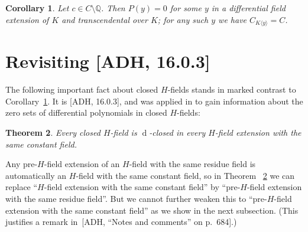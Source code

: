 \documentclass[]{amsart}
\numberwithin{equation}{section}
\newcommand{\bbold}{\mathbb}
\def\Q { {\bbold Q} }
\def \d{\operatorname{d}}
\def \<{\langle}
\def \>{\rangle}
\newtheorem{theorem}{Theorem}[section]
\newtheorem{cor}[theorem]{Corollary}
\theoremstyle{definition}
\theoremstyle{remark}
\newtheorem*{remark}{Remark}
\begin{document}
\begin{cor}\label{cor:RosenlichtOrder1}
Let $c\in C\setminus \Q$. Then $P(y)=0$ for some $y$ in a differential field extension of $K$ and transcendental over $K$; for any such $y$ we have $C_{K\<y\>}=C$.
\end{cor}


\section{Revisiting [ADH, 16.0.3]}\label{sec:revisiting}

\noindent
The following important fact about closed $H$-fields stands in marked contrast to Corollary~\ref{cor:RosenlichtOrder1}. It is [ADH, 16.0.3], and was applied in \cite{ADHdim} to gain information about the zero sets of differential polynomials in closed $H$-fields:

\begin{theorem} \label{thm:16.0.3}
Every closed $H$-field is $\d$-closed in every  $H$-field extension with the same constant field.
\end{theorem}

\noindent
Any pre-$H$-field extension of an $H$-field with the same residue field
is automatically an $H$-field  with the same constant field, so in 
Theorem ~\ref{thm:16.0.3} we can replace ``$H$-field extension with the same constant field''  by
``pre-$H$-field extension with the same residue field''.
But we cannot further weaken this to ``pre-$H$-field extension with the same constant field'' as we show
in the next subsection. (This justifies a remark in~[ADH, ``Notes and comments'' on p.~684].) 
\end{document}
